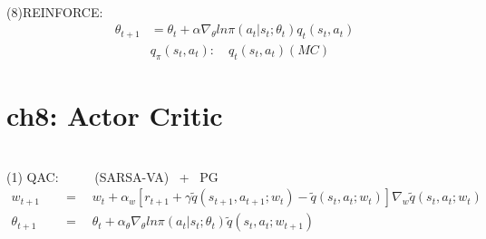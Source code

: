 \documentclass{article}
\begin{document}
~ \\[3pt]
(8)REINFORCE: 
\begin{align*}
    \theta_{t+1} &= \theta_{t} + \alpha \nabla_{\theta} 
                    ln \pi (a_{t} | s_{t}; \theta_{t}) q_{t} (s_{t}, a_{t}) \\[3pt]
    & q_{\pi} (s_{t}, a_{t}) : \quad q_{t} (s_{t}, a_{t}) (MC) 
\end{align*}


\newpage
\section*{ch8: Actor Critic}


~ \\[3pt]
(1) QAC: \ \ \ \ \ {(SARSA-VA) \ + \ PG} 
\begin{align*}
    w_{t+1} & 
            \quad = \quad w_{t} + \alpha_{w} 
            [ r_{t+1} + \gamma \tilde{q}(s_{t+1}, a_{t+1}; w_{t}) 
            - \tilde{q}(s_{t}, a_{t}; w_{t}) ] 
            \nabla_{w} \tilde{q}(s_{t}, a_{t}; w_{t}) \\[3pt]
    \theta_{t+1} & 
            \quad = \quad \theta_{t} + \alpha_{\theta} \nabla_{\theta} 
            ln \pi (a_{t} | s_{t}; \theta_{t}) \tilde{q}(s_{t}, a_{t}; w_{t+1}) 
\end{align*}
\end{document}

